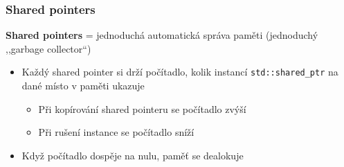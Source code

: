 \documentclass[usenames,dvipsnames,9pt]{beamer}
\begin{document}
\begin{frame}
  \frametitle{Shared pointers}

  \textbf{Shared pointers} = jednoduchá automatická správa paměti (jednoduchý ,,garbage collector``)

  \begin{itemize}
  	\item Každý shared pointer si drží počítadlo, kolik instancí \texttt{std::shared\_ptr} na dané místo v paměti ukazuje
  	      \begin{itemize}
  	      	\item Při kopírování shared pointeru se počítadlo zvýší
  	      	\item Při rušení instance se počítadlo sníží
  	      \end{itemize}
  	\item Když počítadlo dospěje na nulu, paměť se dealokuje
  \end{itemize}
\end{frame}
\end{document}
